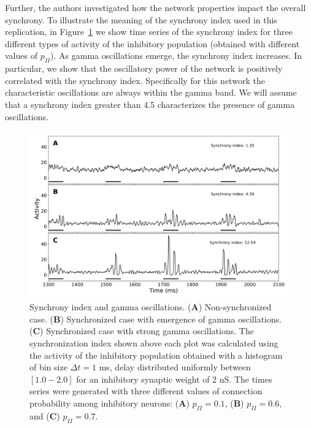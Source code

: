 Further, the authors investigated how the network properties impact the overall synchrony. To illustrate the meaning of the synchrony index used in this replication, in Figure~\ref{fig:examples_synchrony} we show time series of the synchrony index for three different types of activity of the inhibitory population (obtained with different values of $p_{II}$). As gamma oscillations emerge, the synchrony index increases. In particular, we show that the oscillatory power of the network is positively correlated with the synchrony index. Specifically for this network the characteristic oscillations are always within the gamma band. We will assume that a synchrony index greater than 4.5 characterizes the presence of gamma oscillations. %

\begin{figure}[!ht]
\centering
\includegraphics[width=1.0\textwidth]{figures/examples_synchrony_index.png}
\caption{\label{fig:examples_synchrony} Synchrony index and gamma oscillations. (\textbf{A}) Non-synchronized case. (\textbf{B}) Synchronized case with emergence of gamma oscillations. (\textbf{C}) Synchronized case with strong gamma oscillations. The synchronization index shown above each plot was calculated using the activity of the inhibitory population obtained with a histogram of bin size $\Delta t =1$ ms, delay distributed uniformly between $[1.0-2.0]$ for an inhibitory synaptic weight of 2 nS. The times series were generated with three different values of connection probability among inhibitory neurons: (\textbf{A}) $p_{II} = 0.1$, (\textbf{B}) $p_{II} = 0.6$, and (\textbf{C}) $p_{II} = 0.7$.}
\end{figure}
\FloatBarrier


